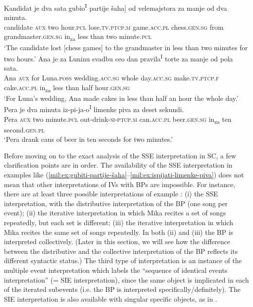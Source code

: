 \documentclass[output=paper,colorlinks,citecolor=brown]{langscibook}
\begin{document}
\ea \label{mil:ex:gubiti-partije-šaha}
\gll Kandidat je dva sata gubio\textsuperscript{I} \minsp{[} partije šaha] od velemajstora za manje od dva minuta.
\\ candidate \textsc{aux} two hour.\textsc{pcl} lose.\textsc{tv.ptcp.m} {} game.\textsc{acc.pl} chess.\textsc{gen.sg} from grandmaster.\textsc{gen.sg} in\textsubscript{za} less than two minute.\textsc{pcl}
     \\
\glt `The candidate lost [chess games] to the grandmaster in less than two minutes for two hours.'
\ex \label{mil:ex:praviti-torte}
\gll Ana je za Luninu svadbu ceo dan pravila\textsuperscript{I} torte za manje od pola sata.
\\ Ana \textsc{aux} for Luna.\textsc{poss} wedding.\textsc{acc.sg} whole day.\textsc{acc.sg} make.\textsc{tv.ptcp.f} cake.\textsc{acc.pl} in\textsubscript{za} less than half hour.\textsc{gen.sg}
     \\
\glt ‘For Luna’s wedding, Ana made cakes in less than half an hour the whole day.’
\ex\label{mil:ex:ispijati-limenke-piva}
\gll Pera	je	dva	minuta		iz-pi-ja-o\textsuperscript{I}	limenke	piva  za	deset	sekundi.
\\ Pera		\textsc{aux}	two	minute.\textsc{pcl}	out-drink-\textsc{si-ptcp.m}	can.\textsc{acc.pl}		beer.\textsc{gen.sg}  in\textsubscript{za}	ten	second.\textsc{gen.pl}
     \\
\glt  ‘Pera drank cans of beer in ten seconds for two minutes.’
\z

\noindent\largerpage{} Before moving on to the exact analysis of the SSE interpretation in SC, a few clarification points are in order. The availability of the SSE interpretation in examples like (\ref{mil:ex:gubiti-partije-šaha}--\ref{mil:ex:ispijati-limenke-piva}) does not mean that other interpretations of IVs with BPs are impossible. For instance, there are at least three possible interpretations of example : (i) the SSE interpretation, with the distributive interpretation of the BP (one song per event); (ii) the iterative interpretation in which Mika recites a set of songs repeatedly, but each set is different; (iii) the iterative interpretation in which Mika recites the same set of songs repeatedly. In both (ii) and (iii) the BP is interpreted collectively. (Later in this section, we will see how the difference between the distributive and the collective interpretation of the BP reflects its different syntactic status.) The third type of interpretation is an instance of the multiple event interpretation which \citet[41]{MacDonald_2008} labels the “sequence of identical events interpretation” (= SIE interpretation), since the same object is implicated in each of the iterated subevents (i.e. the BP is interpreted specifically\slash definitely). The SIE interpretation is also available with singular specific objects, as in . 
\end{document}
